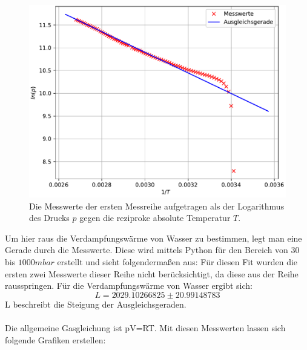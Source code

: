 \begin{figure}
  \includegraphics{Python/plotc.pdf}
  \caption{Die Messwerte der ersten Messreihe aufgetragen als der Logarithmus des Drucks $p$
  gegen die reziproke absolute Temperatur $T$.}
  \label{fig:Teila}
\end{figure}
Um hier raus die Verdampfungswärme von Wasser zu bestimmen, legt man eine Gerade durch die Messwerte.
Diese wird mittels Python für den Bereich von $30$ bis $1000 mbar$ erstellt und sieht folgendermaßen aus:
Für diesen Fit wurden die ersten zwei Messwerte dieser Reihe nicht berücksichtigt, da diese aus der Reihe rausspringen.
Für die Verdampfungswärme von Wasser ergibt sich:
\begin{equation*}
  L = 2029.10266825 \pm 20.99148783
\end{equation*}
L beschreibt die Steigung der Ausgleichsgeraden.\\
\\
Die allgemeine Gasgleichung ist pV=RT. 
Mit diesen Messwerten lassen sich folgende Grafiken erstellen:
